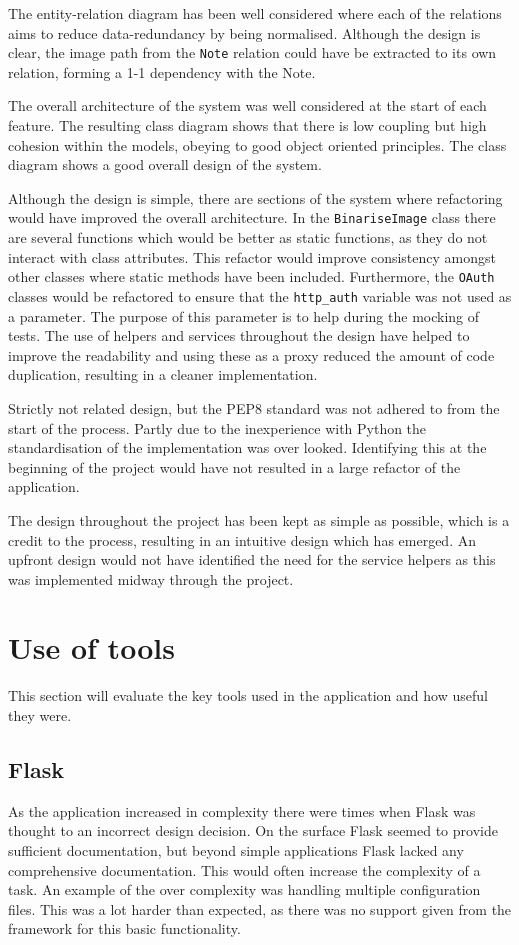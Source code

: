 The entity-relation diagram has been well considered where each of the relations aims to reduce data-redundancy by being normalised. Although the design is clear, the image path from the \texttt{Note} relation could have be extracted to its own relation, forming a 1-1 dependency with the Note.

The overall architecture of the system was well considered at the start of each feature. The resulting class diagram shows that there is low coupling but high cohesion within the models, obeying to good object oriented principles. The class diagram shows a good overall design of the system.

Although the design is simple, there are sections of the system where refactoring would have improved the overall architecture. In the \texttt{BinariseImage} class there are several functions which would be better as static functions, as they do not interact with class attributes. This refactor would improve consistency amongst other classes where static methods have been included. Furthermore, the \texttt{OAuth} classes would be refactored to ensure that the \texttt{http\_auth} variable was not used as a parameter. The purpose of this parameter is to help during the mocking of tests. The use of helpers and services throughout the design have helped to improve the readability and using these as a proxy reduced the amount of code duplication, resulting in a cleaner implementation.

Strictly not related design, but the PEP8 standard \cite{citeulike:14020141} was not adhered to from the start of the process. Partly due to the inexperience with Python the standardisation of the implementation was over looked. Identifying this at the beginning of the project would have not resulted in a large refactor of the application.

The design throughout the project has been kept as simple as possible, which is a credit to the process, resulting in an intuitive design which has emerged. An upfront design would not have identified the need for the service helpers as this was implemented midway through the project.

\section{Use of tools}
This section will evaluate the key tools used in the application and how useful they were.

\subsection{Flask}
As the application increased in complexity there were times when Flask was thought to an incorrect design decision. On the surface Flask seemed to provide sufficient documentation, but beyond simple applications Flask lacked any comprehensive documentation. This would often increase the complexity of a task. An example of the over complexity was handling multiple configuration files. This was a lot harder than expected, as there was no support given from the framework for this basic functionality.

